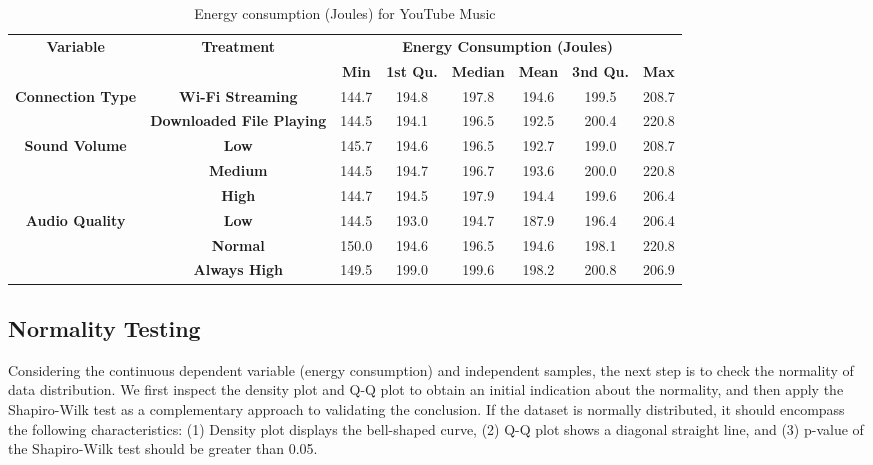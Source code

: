 \begin{table*}[t]
\centering
\caption{Energy consumption (Joules) for YouTube Music}
\label{table1}
\begin{tabular}{|c|c|c|c|c|c|c|c|}
\hline
\multirow{2}{*}{\textbf{Variable}}  & \multirow{2}{*}{\textbf{Treatment}} &  \multicolumn{6}{c|}{\textbf{Energy Consumption (Joules)}}\\
\cline{3-8}
& & \textbf{Min}& \textbf{1st Qu.} & \textbf{Median} & \textbf{Mean} & \textbf{3nd Qu.} & \textbf{Max}

\\
\hline

\multirow{2}{*}{\textbf{Connection Type}}  & \textbf{Wi-Fi Streaming} &  144.7
&194.8
&197.8
&194.6
&199.5
&208.7

\\
\cline{2-8}
&\textbf{Downloaded File Playing}
&144.5
&194.1
&196.5
&192.5
&200.4
&220.8

\\
\hline

\multirow{2}{*}{\textbf{Sound Volume}}  & \textbf{Low} &  
145.7
&194.6
&196.5
&192.7
&199.0
&208.7

\\
\cline{2-8}
&\textbf{Medium}
&144.5
&194.7
&196.7
&193.6
&200.0
&220.8

\\
\cline{2-8}
&\textbf{High}
&144.7
&194.5
&197.9
&194.4
&199.6
&206.4

\\
\hline

\multirow{2}{*}{\textbf{Audio Quality}}  & \textbf{Low} &  
144.5
&193.0
&194.7
&187.9
&196.4
&206.4

\\
\cline{2-8}
&\textbf{Normal}
&150.0
&194.6
&196.5
&194.6
&198.1
&220.8

\\
\cline{2-8}
&\textbf{Always High}
&149.5
&199.0
&199.6
&198.2
&200.8
&206.9

\\
\hline

\end{tabular}
\label{table_MAP}
\end{table*}



\subsection{Normality Testing}
Considering the continuous dependent variable (\ie energy consumption) and independent samples, the next step is to check the normality of data distribution. We first inspect the density plot and Q-Q plot to obtain an initial indication about the normality, and then apply the Shapiro-Wilk test as a complementary approach to validating the conclusion. If the dataset is normally distributed, it should encompass the following characteristics: (1) Density plot displays the bell-shaped curve, (2) Q-Q plot shows a diagonal straight line, and (3) p-value of the Shapiro-Wilk test should be greater than 0.05. 

